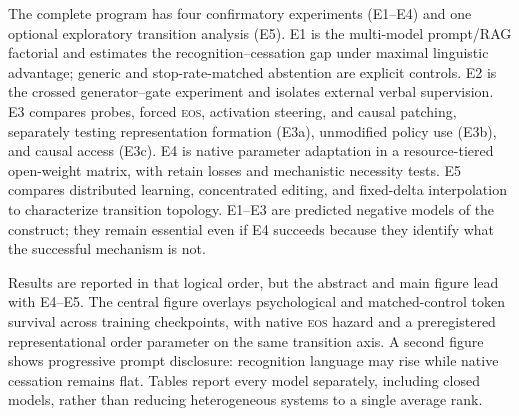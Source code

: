 \documentclass[10pt,twocolumn]{article}
\newcommand{\EOS}{\textsc{eos}}
\begin{document}
The complete program has four confirmatory experiments (E1--E4) and one optional
exploratory transition analysis (E5). E1 is the multi-model
prompt/RAG factorial and estimates the recognition--cessation gap under maximal
linguistic advantage; generic and stop-rate-matched abstention are explicit
controls. E2 is the crossed generator--gate experiment and isolates
external verbal supervision. E3 compares probes, forced \EOS{}, activation
steering, and causal patching, separately testing representation formation
(E3a), unmodified policy use (E3b), and causal access (E3c). E4 is native
parameter adaptation in a resource-tiered open-weight matrix, with retain losses
and mechanistic necessity tests. E5 compares distributed learning, concentrated editing, and
fixed-delta interpolation to characterize transition topology. E1--E3 are
predicted negative models of the construct; they remain essential even if E4
succeeds because they identify what the successful mechanism is not.

Results are reported in that logical order, but the abstract and main figure lead
with E4--E5. The central figure overlays psychological and matched-control token
survival across training checkpoints, with native \EOS{} hazard and a preregistered
representational order parameter on the same transition axis. A second figure
shows progressive prompt disclosure: recognition language may rise while native
cessation remains flat. Tables report every model separately, including closed
models, rather than reducing heterogeneous systems to a single average rank.
\end{document}
